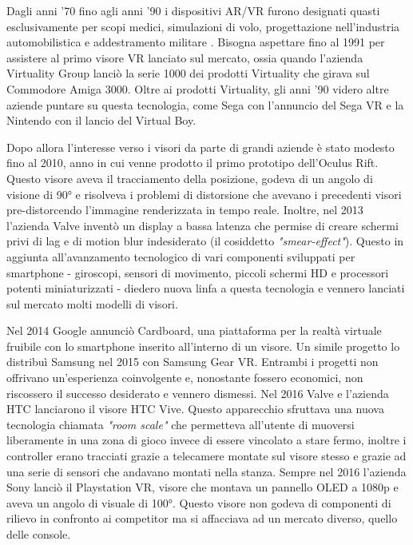         Dagli anni '70 fino agli anni '90 i dispositivi AR/VR furono designati quasti esclusivamente per scopi medici, simulazioni di volo, progettazione nell'industria automobilistica e addestramento militare \cite{70and90VR}.
        Bisogna aspettare fino al 1991 per assistere al primo visore VR lanciato sul mercato, ossia quando l'azienda Virtuality Group lanciò la serie 1000 dei prodotti Virtuality che girava sul Commodore Amiga 3000.
        Oltre ai prodotti Virtuality, gli anni '90 videro altre aziende puntare su questa tecnologia, come Sega con l'annuncio del Sega VR e la Nintendo con il lancio del Virtual Boy.

        Dopo allora l'interesse verso i visori da parte di grandi aziende è stato modesto fino al 2010, anno in cui venne prodotto il primo prototipo dell'Oculus Rift.
        Questo visore aveva il tracciamento della posizione, godeva di un angolo di visione di 90° e risolveva i problemi di distorsione che avevano i precedenti visori pre-distorcendo l'immagine renderizzata in tempo reale.
        Inoltre, nel 2013 l'azienda Valve inventò un display a bassa latenza che permise di creare schermi privi di lag e di motion blur indesiderato (il cosiddetto \textit{"smear-effect"}).
        Questo in aggiunta all'avanzamento tecnologico di vari componenti sviluppati per smartphone - giroscopi, sensori di movimento, piccoli schermi HD e processori potenti miniaturizzati - diedero nuova linfa a questa tecnologia e vennero lanciati sul mercato molti modelli di visori.

        
        Nel 2014 Google annunciò Cardboard, una piattaforma per la realtà virtuale fruibile con lo smartphone inserito all'interno di un visore.
        Un simile progetto lo distribuì Samsung nel 2015 con Samsung Gear VR.
        Entrambi i progetti non offrivano un'esperienza coinvolgente e, nonostante fossero economici, non riscossero il successo desiderato e vennero dismessi. 
        Nel 2016 Valve e l'azienda HTC lanciarono il visore HTC Vive.
        Questo apparecchio sfruttava una nuova tecnologia chiamata \textit{"room scale"} che permetteva all'utente di muoversi liberamente in una zona di gioco invece di essere vincolato a stare fermo, inoltre i controller erano tracciati grazie a telecamere montate sul visore stesso e grazie ad una serie di sensori che andavano montati nella stanza.
        Sempre nel 2016 l'azienda Sony lanciò il Playstation VR, visore che montava un pannello OLED a 1080p e aveva un angolo di visuale di 100°.
        Questo visore non godeva di componenti di rilievo in confronto ai competitor ma si affacciava ad un mercato diverso, quello delle console. 

